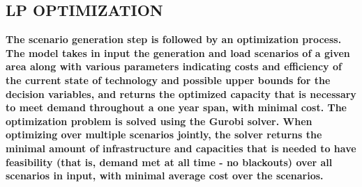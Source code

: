 \subsection{LP OPTIMIZATION}

\textbf{The scenario generation step is followed by an optimization process. The model takes in input the
generation and load scenarios of a given area along with various parameters indicating costs and
efficiency of the current state of technology and possible upper bounds for the decision variables, and
returns the optimized capacity that is necessary to meet demand throughout a one year span, with minimal
cost. The optimization problem is solved using the Gurobi solver. When optimizing over multiple
scenarios jointly, the solver returns the minimal amount of infrastructure and capacities that is needed to
have feasibility (that is, demand met at all time - no blackouts) over all scenarios in input, with minimal
average cost over the scenarios.}\\



